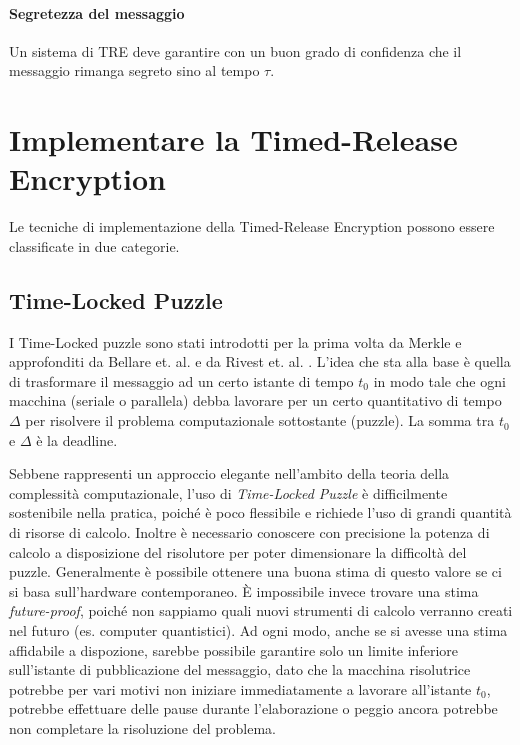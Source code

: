 \paragraph{Segretezza del messaggio}
\label{parag:segretezza-tre}
Un sistema di TRE deve garantire con un buon
grado di confidenza che il messaggio rimanga segreto sino al tempo $ \tau $.


\section{Implementare la Timed-Release Encryption}
Le tecniche di implementazione della Timed-Release Encryption possono essere classificate
in due categorie.

\subsection{Time-Locked Puzzle}
I Time-Locked puzzle sono stati introdotti per la prima volta
da Merkle \cite{Merkle:1978:SCO:359460.359473} e approfonditi
da Bellare et. al. \cite{Bellare:1996:EKE:888619}
e da Rivest et. al. \cite{Rivest96time-lockpuzzles}.
L'idea che sta alla base è quella di trasformare il messaggio ad un certo istante di tempo $ t_0 $
in modo tale che ogni macchina
(seriale o parallela) debba lavorare per un certo quantitativo di tempo $ \Delta $ per risolvere
il problema computazionale sottostante (puzzle). La somma tra $ t_0 $ e $ \Delta $ è la deadline.

Sebbene rappresenti un approccio elegante nell'ambito della teoria della complessità computazionale,
l'uso di \textit{Time-Locked Puzzle} è difficilmente sostenibile nella pratica,
poiché è poco flessibile e richiede l'uso di
grandi quantità di risorse di calcolo. Inoltre è necessario conoscere con
precisione la potenza di calcolo a disposizione del risolutore per poter
dimensionare la difficoltà del puzzle. Generalmente è possibile ottenere
una buona stima di questo valore se ci si basa sull'hardware contemporaneo. È impossibile
invece trovare una stima \textit{future-proof}, poiché non sappiamo quali nuovi strumenti di
calcolo verranno creati nel futuro (es. computer quantistici).
Ad ogni modo, anche se si avesse una stima affidabile a dispozione,
sarebbe possibile garantire solo un limite inferiore
sull'istante di pubblicazione del messaggio, dato che la macchina risolutrice potrebbe per vari motivi
non iniziare immediatamente a lavorare all'istante $ t_0 $,
potrebbe effettuare delle pause durante l'elaborazione
o peggio ancora potrebbe non completare la risoluzione del problema.


